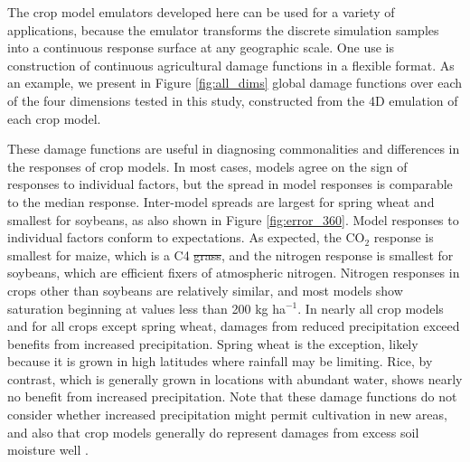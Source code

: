 \documentclass[gmdd]{copernicus} %
\providecommand{\DIFadd}[1]{{\protect\color{blue}\uwave{#1}}} %
\providecommand{\DIFdel}[1]{{\protect\color{red}\sout{#1}}}                      %
\providecommand{\DIFaddbegin}{} %
\providecommand{\DIFaddend}{} %
\providecommand{\DIFdelbegin}{} %
\providecommand{\DIFdelend}{} %
\begin{document}
The crop model emulators developed here can be used for a variety of applications, because the emulator transforms the discrete simulation samples into a continuous response surface at any geographic scale. One use is construction of continuous agricultural damage functions in a flexible format. 
As an example, we present in  Figure \ref{fig:all_dims} global damage functions over each of the four dimensions tested in this study, constructed from the 4D emulation of each crop model.

These damage functions are useful in diagnosing commonalities and differences in the responses of crop models. 
In most cases, models agree on the sign of responses to individual factors, but the spread in model responses is comparable to the median response. Inter-model spreads are largest for spring wheat and smallest for soybeans, as also shown in Figure \ref{fig:error_360}.
Model responses to individual factors conform to expectations. As expected, the CO$_2$ response is smallest for maize, which is a C4 \DIFdelbegin \DIFdel{grass}\DIFdelend \DIFaddbegin \DIFadd{crop}\DIFaddend , and the nitrogen response is smallest for soybeans, which are efficient fixers of atmospheric nitrogen. Nitrogen responses in crops other than soybeans are relatively similar, and most models show saturation beginning at values less than 200 kg ha$^{-1}$.
In nearly all crop models and for all crops except spring wheat, damages from reduced precipitation exceed benefits from increased precipitation. Spring wheat is the exception, likely because it is grown in high latitudes where rainfall may be limiting. Rice, by contrast, which is generally grown in locations with abundant water, shows nearly no benefit from increased precipitation.
Note that these damage functions do not consider whether increased precipitation might permit cultivation in new areas, and also that crop models generally do represent damages from excess soil moisture well \citep{Li2019}.
\end{document}
